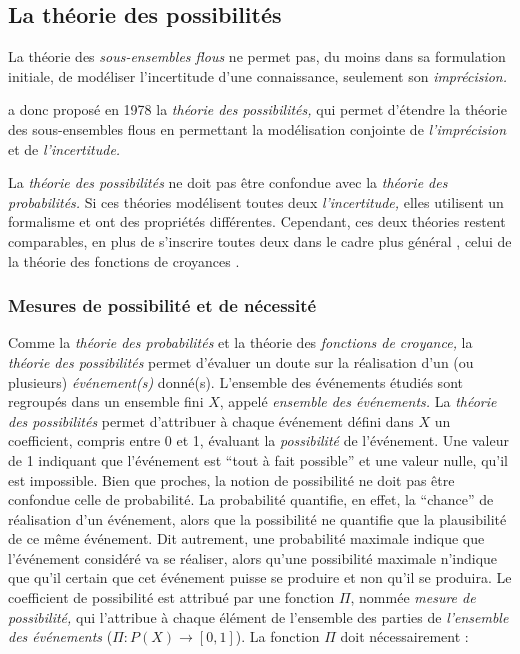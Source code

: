 

\subsection{La théorie des possibilités}


La théorie des \emph{sous-ensembles flous} ne permet pas, du moins
dans sa formulation initiale, de modéliser l'incertitude d'une
connaissance, seulement son \emph{imprécision.}

\textcite{Zadeh1978} a donc proposé en 1978 la \emph{théorie des
  possibilités,} qui permet d'étendre la théorie des sous-ensembles
flous en permettant la modélisation conjointe de \emph{l'imprécision}
et de \emph{l'incertitude.}

La \emph{théorie des possibilités} ne doit pas être confondue avec la
\emph{théorie des probabilités.} Si ces théories modélisent toutes
deux \emph{l'incertitude,} elles utilisent un formalisme et ont des
propriétés différentes. Cependant, ces deux théories restent
comparables, en plus de s’inscrire toutes deux dans le cadre plus
général \autocite{Bouchon-Meunier1995}, celui de la théorie des
fonctions de croyances \autocite{Shafer1976}.

\subsubsection{Mesures de possibilité et de nécessité}

Comme la \emph{théorie des probabilités} et la théorie des
\emph{fonctions de croyance,} la \emph{théorie des possibilités}
permet d'évaluer un doute sur la réalisation d'un (ou plusieurs)
\emph{événement(s)} donné(s). L'ensemble des événements étudiés sont
regroupés dans un ensemble fini \(X\), appelé \emph{ensemble des
  événements.} La \emph{théorie des possibilités} permet d'attribuer à
chaque événement défini dans \(X\) un coefficient, compris entre 0 et
1, évaluant la \emph{possibilité} de l'événement. Une valeur de 1
indiquant que l'événement est \enquote{tout à fait possible}
\autocite[p. 43]{Bouchon-Meunier2007} et une valeur nulle, qu'il est
impossible. Bien que proches, la notion de possibilité ne doit pas
être confondue celle de probabilité. La probabilité quantifie, en
effet, la \enquote{chance} de réalisation d'un événement, alors que la
possibilité ne quantifie que la plausibilité de ce même événement. Dit
autrement, une probabilité maximale indique que l'événement considéré
va se réaliser, alors qu'une possibilité maximale n'indique que qu'il
certain que cet événement puisse se produire et non qu'il se produira.
Le coefficient de possibilité est attribué par une fonction \(Π\),
nommée \emph{mesure de possibilité,} qui l'attribue à chaque élément
de l'ensemble des parties de \emph{l'ensemble des événements}
(\(Π : P(X) → [0,1]\)). La fonction \(Π\) doit nécessairement :


